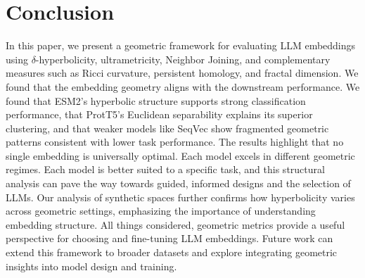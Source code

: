 \documentclass[]{Liebert_Author_revised}
\begin{document}


\section{Conclusion}
\label{sec_conclusion}
In this paper, we present a geometric framework for evaluating LLM embeddings using $\delta$-hyperbolicity, ultrametricity, Neighbor Joining, and complementary measures such as Ricci curvature, persistent homology, and fractal dimension. We found that the embedding geometry aligns with the downstream performance. We found that ESM2's hyperbolic structure supports strong classification performance, that ProtT5’s Euclidean separability explains its superior clustering, and that weaker models like SeqVec show fragmented geometric patterns consistent with lower task performance. The results highlight that no single embedding is universally optimal. Each model excels in different geometric regimes. Each model is better suited to a specific task, and this structural analysis can pave the way towards guided, informed designs and the selection of LLMs.
Our analysis of synthetic spaces further confirms how hyperbolicity varies across geometric settings, emphasizing the importance of understanding embedding structure. All things considered, geometric metrics provide a useful perspective for choosing and fine-tuning LLM embeddings. Future work can extend this framework to broader datasets and explore integrating geometric insights into model design and training.
\end{document}
